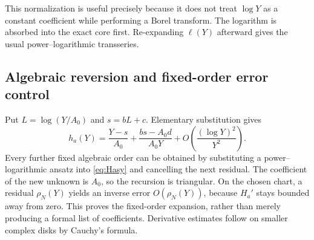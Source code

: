 \documentclass[11pt,a4paper]{article}
\numberwithin{equation}{section}
\theoremstyle{definition}
\theoremstyle{remark}
\begin{document}
This normalization is useful precisely because it does not treat
$\log Y$ as a constant coefficient while performing a Borel transform.
The logarithm is absorbed into the exact core first. Re-expanding
$\ell(Y)$ afterward gives the usual power--logarithmic transseries.

\subsection{Algebraic reversion and fixed-order error control}
Put $L=\log(Y/A_0)$ and $s=bL+c$. Elementary substitution gives
\begin{equation}
 h_a(Y)=\frac{Y-s}{A_0}
       +\frac{bs-A_0d}{A_0Y}
       +O\!\left(\frac{(\log Y)^2}{Y^2}\right).
 \label{eq:halgebraic}
\end{equation}
Every further fixed algebraic order can be obtained by substituting a
power--logarithmic ansatz into \eqref{eq:Hasy} and cancelling the next
residual. The coefficient of the new unknown is $A_0$, so the recursion
is triangular. On the chosen chart, a residual $\rho_N(Y)$ yields an
inverse error $O(\rho_N(Y))$, because $H_a'$ stays bounded away from
zero. This proves the fixed-order expansion, rather than merely
producing a formal list of coefficients. Derivative estimates follow
on smaller complex disks by Cauchy's formula.
\end{document}
